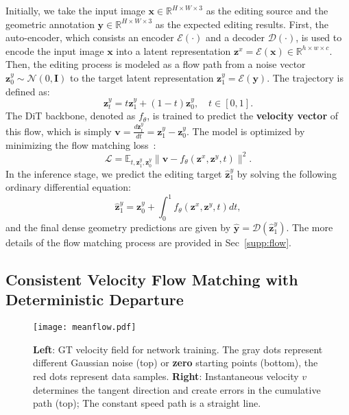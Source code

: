 \documentclass{article} %
\begin{document}
Initially, we take the input image $\mathbf{x} \in \mathbb{R}^{H \times W \times 3}$ as the editing source and the geometric annotation $\mathbf{y} \in \mathbb{R}^{H \times W \times 3}$ as the expected editing results. First, the auto-encoder, which consists an encoder $\mathcal{E}(\cdot)$ and a decoder $\mathcal{D}(\cdot)$, is used to encode the input image $\mathbf{x}$ into a latent representation $\mathbf{z}^x = \mathcal{E}(\mathbf{x})\in \mathbb{R}^{h \times w \times c}$. 
Then, the editing process is modeled as a flow path from a noise vector $\mathbf{z}^y_0 \sim \mathcal{N}(0, \mathbf{I})$ to the target latent representation $\mathbf{z}^y_1 = \mathcal{E}(\mathbf{y})$. The trajectory is defined as:
\begin{equation}
\label{eq:rectified_flow}
    \mathbf{z}^y_t = t \mathbf{z}^y_1 + (1-t) \mathbf{z}^y_0, \quad t \in [0, 1].
\end{equation}
The DiT backbone, denoted as $f_\theta$, is trained to predict the \textbf{velocity vector} of this flow, which is simply $\mathbf{v} = \frac{d\mathbf{z}^y_t}{dt} = \mathbf{z}^y_1 - \mathbf{z}^y_0$. The model is optimized by minimizing the flow matching loss~\citep{flowmatch}:
\begin{equation}
    \label{eq:loss_original}
        \mathcal{L} = \mathbb{E}_{t,\mathbf{z}^y_1, \mathbf{z}^y_0} \| \mathbf{v} - f_\theta(\mathbf{z}^x, \mathbf{z}^y, t) \|^2.
\end{equation}
In the inference stage, we predict the editing target $\hat{\mathbf{z}}^y_1$ by solving the following ordinary differential equation:
\begin{equation}
\label{eq:ode}
\hat{\mathbf{z}}^y_1 = \mathbf{z}^y_0 + \int_0^1 f_\theta(\mathbf{z}^x,\mathbf{z}^y, t) dt ,
\end{equation}%
and the final dense geometry predictions are given by $\hat{\mathbf{y}} = \mathcal{D}(\hat{\mathbf{z}}^y_1)$. The more details of the flow matching process are provided in Sec~\ref{supp:flow}.


\subsection{Consistent Velocity Flow Matching with Deterministic Departure}
\label{sec:consistent}
\begin{wrapfigure}{r}{0.5\textwidth}
    \vspace{-6mm}
    \centering
    \texttt{[image: meanflow.pdf]}
    \caption{\textbf{Left}: GT velocity field for network training. The gray dots represent different Gaussian noise (top) or \textbf{zero} starting points (bottom), the red dots represent data samples. \textbf{Right}: Instantaneous velocity $v$ determines the tangent direction and create errors in the cumulative path (top); The constant speed path is a straight line.
    }%
    \vspace{-6mm}
    \label{fig:meanflow}
\end{wrapfigure}
\end{document}
